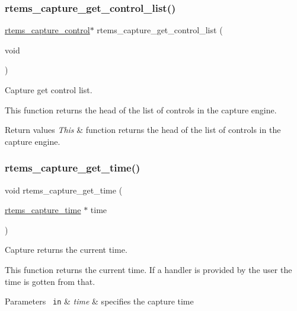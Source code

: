 \subsubsection{\texorpdfstring{rtems\_capture\_get\_control\_list()}{rtems\_capture\_get\_control\_list()}}
{\footnotesize\ttfamily \mbox{\hyperlink{structrtems__capture__control}{rtems\+\_\+capture\+\_\+control}}$\ast$ rtems\+\_\+capture\+\_\+get\+\_\+control\+\_\+list (\begin{DoxyParamCaption}\item[{void}]{ }\end{DoxyParamCaption})}



Capture get control list. 

This function returns the head of the list of controls in the capture engine.


\begin{DoxyRetVals}{Return values}
{\em This} & function returns the head of the list of controls in the capture engine. \\
\hline
\end{DoxyRetVals}
\mbox{\label{group__libmisc__capture_gac9c469ba4a3719c8f240f9a5aad50ddb}} 
\subsubsection{\texorpdfstring{rtems\_capture\_get\_time()}{rtems\_capture\_get\_time()}}
{\footnotesize\ttfamily void rtems\+\_\+capture\+\_\+get\+\_\+time (\begin{DoxyParamCaption}\item[{\mbox{\hyperlink{group__libmisc__capture_gaf4cab587ea286bb2352fcfab9c223560}{rtems\+\_\+capture\+\_\+time}} $\ast$}]{time }\end{DoxyParamCaption})}



Capture returns the current time. 

This function returns the current time. If a handler is provided by the user the time is gotten from that.


\begin{DoxyParams}[1]{Parameters}
\mbox{\texttt{ in}}  & {\em time} & specifies the capture time\\
\hline
\end{DoxyParams}

